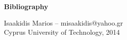 \documentclass[12pt,a4paper,oneside]{article}
\begin{document}


\newpage
{}
{}
{\Huge \bf \noindent Bibliography}
\nocite{*}

\renewcommand{\refname}{}


\pagestyle{empty}
\label{sec:appendix}


\newpage
{}
\vspace*{\fill}
\hrulefill
\begin{center}
Isaakidis Marios -- misaakidis@yahoo.gr\\
Cyprus University of Technology, 2014
\end{center}
\end{document}
